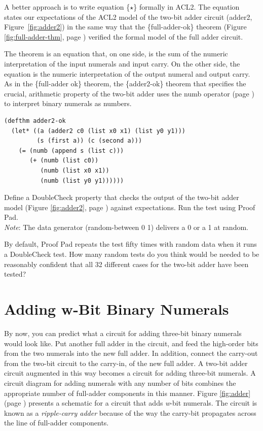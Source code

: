 A better approach is to write equation \{$\star$\}
formally in ACL2. The equation states our expectations of
the ACL2 model of the
two-bit adder circuit (\textsf{adder2}, Figure~\ref{fig:adder2})
in the same way that the \{full-adder-ok\} theorem
(Figure \ref{fig:full-adder-thm}, page \pageref{fig:full-adder-thm})
verified the formal model of the full adder circuit.

The theorem is an equation that, on one side, is the
sum of the numeric interpretation of the input numerals
and input carry. On the other side, the equation is
the numeric interpretation of the output numeral
and output carry.
As in the \{full-adder ok\} theorem,
the \{adder2-ok\} theorem that specifies
the crucial, arithmetic property of the two-bit adder
uses the \textsf{numb} operator (page \pageref{nmb-defun})
to interpret binary numerals as numbers.

\label{adder2-ok}
\begin{Verbatim}
(defthm adder2-ok
  (let* ((a (adder2 c0 (list x0 x1) (list y0 y1)))
         (s (first a)) (c (second a)))
    (= (numb (append s (list c)))
       (+ (numb (list c0))
          (numb (list x0 x1))
          (numb (list y0 y1))))))
\end{Verbatim}

\begin{ExerciseList}
\Exercise Define a DoubleCheck property that checks the
output of the two-bit adder model
(Figure \ref{fig:adder2}, page \pageref{fig:adder2})
against expectations.
Run the test using Proof Pad.\\
\emph{Note}: The data generator (random-between 0 1) delivers
a 0 or a 1 at random.

\Exercise By default, Proof Pad repeats the test fifty times
with random data
when it runs a DoubleCheck test.
How many random tests do you think would be needed to be reasonably
confident that all 32 different cases for the two-bit adder have been tested?
\end{ExerciseList}

\section{Adding w-Bit Binary Numerals}
\label{sec:adding-w-bit-numerals}

By now, you can predict what a circuit for adding three-bit
binary numerals would look like.
Put another full adder in the circuit, and feed the
high-order bits from the two numerals into the new full adder.
In addition, connect the carry-out from the two-bit circuit
to the carry-in, of the new full adder.
A two-bit adder circuit augmented in this way
becomes a circuit for adding three-bit numerals.
A circuit diagram for adding numerals with any number of bits
combines the appropriate number of
full-adder components in this manner.
Figure \ref{fig:adder} (page \pageref{fig:adder}) presents a schematic
for a circuit that adds \emph{w}-bit numerals.
The circuit is known as a \emph{ripple-carry adder} because
of the way the carry-bit propagates across the line
of full-adder components.

